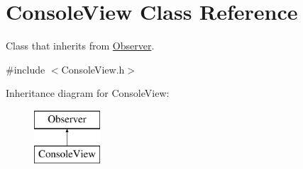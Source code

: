 \hypertarget{class_console_view}{}\section{Console\+View Class Reference}
\label{class_console_view}


Class that inherits from \hyperlink{class_observer}{Observer}.  




{\ttfamily \#include $<$Console\+View.\+h$>$}

Inheritance diagram for Console\+View\+:\begin{figure}[H]
\begin{center}
\leavevmode
\includegraphics[height=2.000000cm]{class_console_view}
\end{center}
\end{figure}
